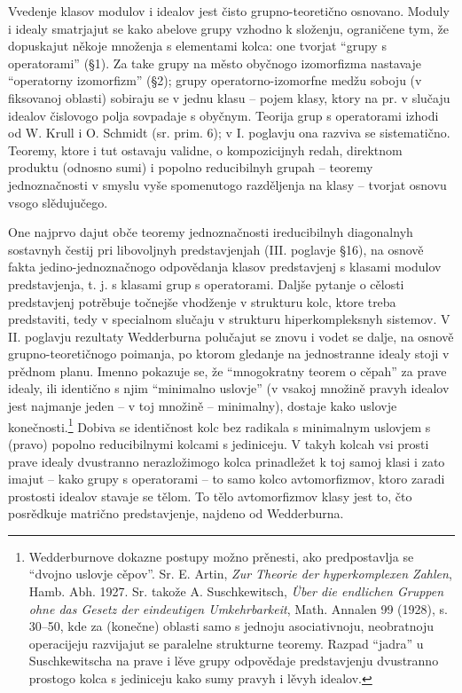 \documentclass[11pt]{article}
\begin{document}
Vvedenje klasov modulov i idealov jest čisto grupno-teoretično osnovano. Moduly i idealy smatrjajut se kako abelove grupy vzhodno k složenju, ograničene tym, že dopuskajut někoje množenja s elementami kolca: one tvorjat “grupy s operatorami” (§1). Za take grupy na město obyčnogo izomorfizma nastavaje “operatorny izomorfizm” (§2); grupy operatorno-izomorfne medžu soboju (v fiksovanoj oblasti) sobiraju se v jednu klasu -- pojem klasy, ktory na pr. v slučaju idealov čislovogo polja sovpadaje s obyčnym. Teorija grup s operatorami izhodi od W. Krull i O. Schmidt (sr. prim. 6); v I. poglavju ona razviva se sistematično. Teoremy, ktore i tut ostavaju validne, o kompozicijnyh redah, direktnom produktu (odnosno sumi) i popolno reducibilnyh grupah -- teoremy jednoznačnosti v smyslu vyše spomenutogo razděljenja na klasy -- tvorjat osnovu vsogo slědujučego.

One najprvo dajut obče teoremy jednoznačnosti ireducibilnyh diagonalnyh sostavnyh čestij pri libovoljnyh predstavjenjah (III. poglavje §16), na osnově fakta jedino-jednoznačnogo odpovědanja klasov predstavjenj s klasami modulov predstavjenja, t. j. s klasami grup s operatorami. Daljše pytanje o cělosti predstavjenj potrěbuje točnejše vhodženje v strukturu kolc, ktore treba predstaviti, tedy v specialnom slučaju v strukturu hiperkompleksnyh sistemov. V II. poglavju rezultaty Wedderburna polučajut se znovu i vodet se dalje, na osnově grupno-teoretičnogo poimanja, po ktorom gledanje na jednostranne idealy stoji v prědnom planu. Imenno pokazuje se, že “mnogokratny teorem o cěpah” za prave idealy, ili identično s njim “minimalno uslovje” (v vsakoj množině pravyh idealov jest najmanje jeden -- v toj množině -- minimalny), dostaje kako uslovje konečnosti.\footnote{Wedderburnove dokazne postupy možno prěnesti, ako predpostavlja se “dvojno uslovje cěpov”. Sr. E. Artin, \emph{Zur Theorie der hyperkomplexen Zahlen}, Hamb. Abh. 1927. Sr. takože A. Suschkewitsch, \emph{Über die endlichen Gruppen ohne das Gesetz der eindeutigen Umkehrbarkeit}, Math. Annalen 99 (1928), s. 30--50, kde za (konečne) oblasti samo s jednoju asociativnoju, neobratnoju operacijeju razvijajut se paralelne strukturne teoremy. Razpad “jadra” u Suschkewitscha na prave i lěve grupy odpovědaje predstavjenju dvustranno prostogo kolca s jediniceju kako sumy pravyh i lěvyh idealov.} Dobiva se identičnost kolc bez radikala s minimalnym uslovjem s (pravo) popolno reducibilnymi kolcami s jediniceju. V takyh kolcah vsi prosti prave idealy dvustranno nerazložimogo kolca prinadležet k toj samoj klasi i zato imajut -- kako grupy s operatorami -- to samo kolco avtomorfizmov, ktoro zaradi prostosti idealov stavaje se tělom. To tělo avtomorfizmov klasy jest to, čto posrědkuje matrično predstavjenje, najdeno od Wedderburna.
\end{document}
